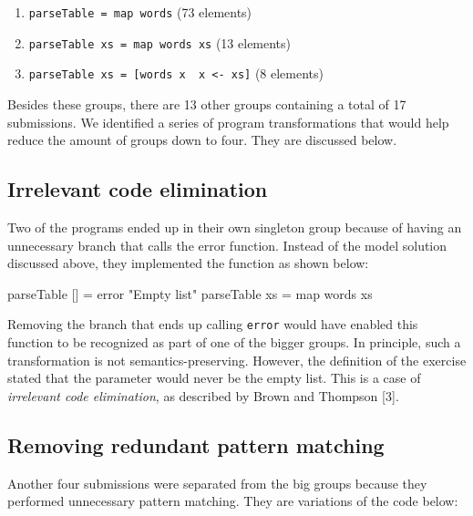 \documentclass[a4paperpaper,]{report}
\newenvironment{Shaded}{}{}
\newcommand{\StringTok}[1]{\textcolor[rgb]{0.25,0.44,0.63}{#1}}
\newcommand{\FunctionTok}[1]{\textcolor[rgb]{0.02,0.16,0.49}{#1}}
\newcommand{\NormalTok}[1]{#1}
\providecommand{\tightlist}{%
  \setlength{\itemsep}{0pt}\setlength{\parskip}{0pt}}
\begin{document}
\begin{enumerate}
\def\labelenumi{\arabic{enumi}.}
\tightlist
\item
  \texttt{parseTable\ =\ map\ words} (73 elements)
\item
  \texttt{parseTable\ xs\ =\ map\ words\ xs} (13 elements)
\item
  \texttt{parseTable\ xs\ =\ {[}words\ x\ \textbar{}\ x\ \textless{}-\ xs{]}}
  (8 elements)
\end{enumerate}

Besides these groups, there are 13 other groups containing a total of 17
submissions. We identified a series of program transformations that
would help reduce the amount of groups down to four. They are discussed
below.

\hypertarget{irrelevant-code-elimination}{%
\subsection{Irrelevant code
elimination}\label{irrelevant-code-elimination}}

Two of the programs ended up in their own singleton group because of
having an unnecessary branch that calls the error function. Instead of
the model solution discussed above, they implemented the function as
shown below:

\begin{Shaded}
\begin{Highlighting}[]
\NormalTok{parseTable [] }\FunctionTok{=}\NormalTok{ error }\StringTok{"Empty list"}
\NormalTok{parseTable xs }\FunctionTok{=}\NormalTok{ map words xs}
\end{Highlighting}
\end{Shaded}

Removing the branch that ends up calling \texttt{error} would have
enabled this function to be recognized as part of one of the bigger
groups. In principle, such a transformation is not semantics-preserving.
However, the definition of the exercise stated that the parameter would
never be the empty list. This is a case of \emph{irrelevant code
elimination}, as described by Brown and Thompson {[}3{]}.

\hypertarget{removing-redundant-pattern-matching}{%
\subsection{Removing redundant pattern
matching}\label{removing-redundant-pattern-matching}}

Another four submissions were separated from the big groups because they
performed unnecessary pattern matching. They are variations of the code
below:
\end{document}
